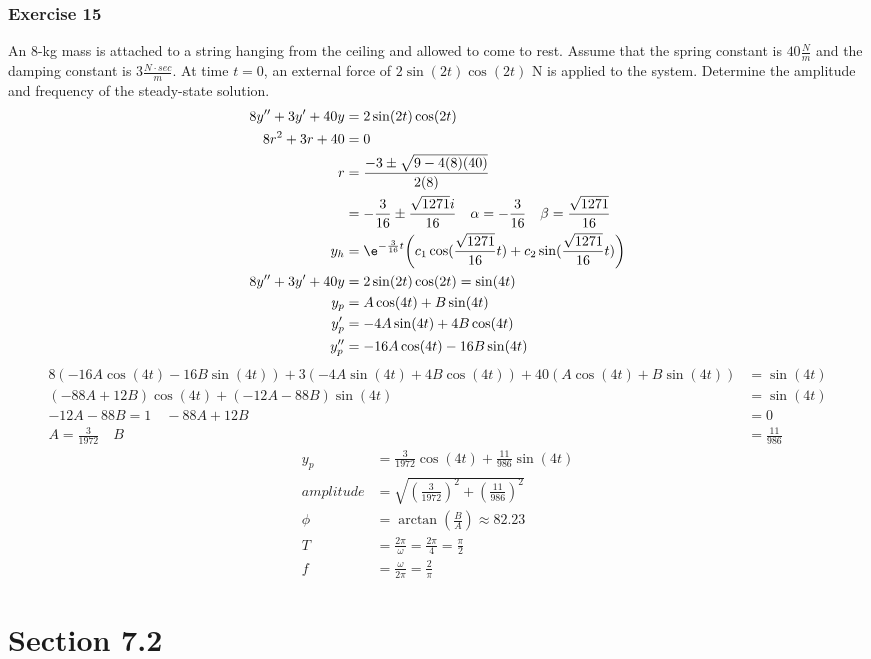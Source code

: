 \documentclass{math}
\begin{document}
\subsubsection*{Exercise 15}
An 8-kg mass is attached to a string hanging from the ceiling and allowed
to come to rest. Assume that the spring constant is \( 40\frac{N}{m} \) and the
damping constant is \( 3\frac{N\cdot sec}{m} \). At time \( t = 0 \), an
external force of \( 2\sin(2t)\cos(2t) \) N is applied to the system. Determine
the amplitude and frequency of the steady-state solution.
\begin{align*}
  8y''+3y'+40y &= 2\sin(2t)\cos(2t) \\
  8r^2+3r+40 &= 0 \\
  r &= \frac{-3\pm\sqrt{9-4(8)(40)}}{2(8)} \\
  &= -\frac{3}{16}\pm\frac{\sqrt{1271}i}{16} \quad \alpha = -\frac{3}{16} \quad
    \beta = \frac{\sqrt{1271}}{16} \\
  y_h &= \e^{-\frac{3}{16}t}\bigg(c_1\cos(\frac{\sqrt{1271}}{16}t)+
    c_2\sin(\frac{\sqrt{1271}}{16}t)\bigg) \\
  8y''+3y'+40y &= 2\sin(2t)\cos(2t) = \sin(4t) \\
  y_p &= A\cos(4t)+B\sin(4t) \\
  y_p' &= -4A\sin(4t)+4B\cos(4t) \\
  y_p'' &= -16A\cos(4t)-16B\sin(4t)
\end{align*}
\begin{align*}
  8(-16A\cos(4t)-16B\sin(4t))+3(-4A\sin(4t)+4B\cos(4t))+40(A\cos(4t)+B\sin(4t))
    &= \sin(4t) \\
  (-88A+12B)\cos(4t)+(-12A-88B)\sin(4t) &= \sin(4t) \\
  -12A-88B = 1 \quad -88A+12B &= 0 \\
  A = \frac{3}{1972} \quad B &= \frac{11}{986}
\end{align*}
\begin{align*}
  y_p &= \frac{3}{1972}\cos(4t)+\frac{11}{986}\sin(4t) \\
  amplitude &= \sqrt{(\frac{3}{1972})^2+(\frac{11}{986})^2} \\
  \phi &= \arctan(\frac{B}{A}) \approx 82.23 \\
  T &= \frac{2\pi}{\omega} = \frac{2\pi}{4} = \frac{\pi}{2} \\
  f &= \frac{\omega}{2\pi} = \frac{2}{\pi}
\end{align*}

\section*{Section 7.2}
\end{document}
